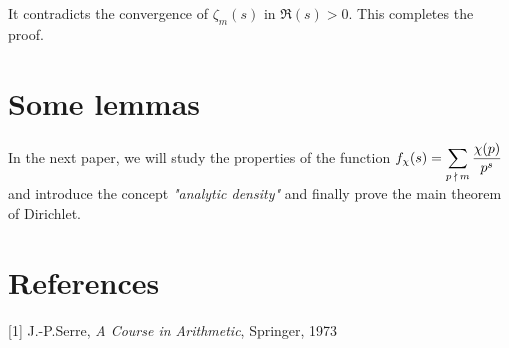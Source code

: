 \documentclass[11pt]{article}
\begin{document}
\noindent It contradicts the convergence of $\zeta_m(s)$ in $\Re(s)>0$. This completes the proof.
\vspace{10mm}

\section{Some lemmas}
In the next paper, we will study the properties of the function $f_{\chi}(s)=\displaystyle\sum_{p\:\nmid\: m}{\chi(p)\over p^s}$ and introduce the concept \textit{"analytic density"} and finally prove the main theorem of Dirichlet.
\vspace{10mm}

\section*{References}
[1] J.-P.Serre, \textit{A Course in Arithmetic}, Springer, 1973
\end{document}
